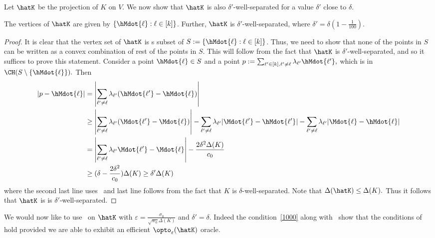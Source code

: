 Let $\hatK$ be the projection of $K$ on $V$. We now show that $\hatK$ is also $\delta'$-well-separated for a value $\delta'$ close to $\delta$. 
\begin{lemma}
    \label{lem:hatK}
    The vertices of $\hatK$ are given by  $\{\hMdot{\ell}: \ell \in [k]\}$. Further, $ \hatK$ is $\delta'$-well-separated, where $\delta'= \delta \left( 1 - \frac{1}{100} \right)$. 
\end{lemma}
\begin{proof}
    It is clear that the vertex set of $\hatK$ is s subset of $S := \{\hMdot{\ell}: \ell \in [k]\}$. Thus, we need to show that none of the points in $S$ can be written as a convex combination of rest of the points in $S$. This will follow from the fact that $\hatK$ is $\delta'$-well-separated, and so it suffices to prove this statement. Consider a point $\hMdot{\ell} \in S$ and a point $p:= \sum_{\ell' \in [k], \ell' \neq \ell} \lambda_{\ell'} \hMdot{\ell'},$ which is in $\CH(S \setminus\{\hMdot{\ell}\}).$ Then 
    \begin{align*}
        |p-\hMdot{\ell}| & = \left| \sum_{\ell' \neq \ell} \lambda_{\ell'} (\hMdot{\ell'} - \hMdot{\ell} ) \right| \\
        & \geq \left| \sum_{\ell' \neq \ell} \lambda_{\ell'} (\Mdot{\ell'} - \Mdot{\ell} ) \right| - \sum_{\ell' \neq \ell} \lambda_{\ell'} |\Mdot{\ell'}-\hMdot{\ell'}| - 
       \sum_{\ell' \neq \ell} \lambda_{\ell'} |\Mdot{\ell} - \hMdot{\ell}| \\
        & = \left| \sum_{\ell' \neq \ell} \lambda_{\ell'} \Mdot{\ell'} - \Mdot{\ell} \right| - \frac{2\delta^2 \Delta(K)}{c_0} \\
        & \geq (\delta - \frac{2\delta^2}{c_0}) \Delta(K) \geq \delta' \Delta(K)
    \end{align*}
    where the second last line uses~ and last line follows from  the fact that $K$ is $\delta$-well-separated. Note that $\Delta(\hatK) \leq \Delta(K).$ Thus it follows that $\hatK$ is is $\delta'$-well-separated.
\end{proof}



We would now like to use~ on $\hatK$ with $\varepsilon = \frac{\sigma_0}{\sqrt{w_0}\Delta(K)}$ and $\delta'=\delta$. Indeed the condition~\eqref{1000} along with~ show that the conditions of~ hold provided we are able to exhibit an efficient $\opto_\varepsilon(\hatK)$ oracle. 

